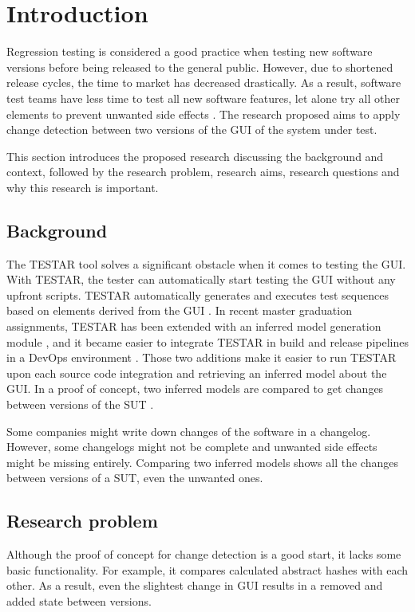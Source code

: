 \chapter{Introduction} \label{introduction}
    
Regression testing is considered a good practice when testing new software versions before being released to the general public. 
However, due to shortened release cycles, the time to market has decreased drastically. As a result, software test teams have less time to test all new software features, let alone try all other elements to prevent unwanted side effects \cite{rapid-release-cycle-issues}.
The research proposed aims to apply change detection between two versions of the GUI of the system under test. 

This section introduces the proposed research discussing the background and context, followed by the research problem, research aims, research questions and why this research is important.

\section{Background}
The TESTAR tool solves a significant obstacle when it comes to testing the GUI. With TESTAR, the tester can automatically start testing the GUI without any upfront scripts. TESTAR automatically generates and executes test sequences based on elements derived from the GUI \cite{VosAho2021}. In recent master graduation assignments, TESTAR has been extended with an inferred model generation module \cite{thesisMulders}, and it became easier to integrate TESTAR in build and release pipelines in a DevOps environment \cite{thesisSlomp}. Those two additions make it easier to run TESTAR upon each source code integration and retrieving an inferred model about the GUI. In a proof of concept, two inferred models are compared to get changes between versions of the SUT \cite{stateDiff}.

Some companies might write down changes of the software in a changelog. However, some changelogs might not be complete and unwanted side effects might be missing entirely. Comparing two inferred models shows all the changes between versions of a SUT, even the unwanted ones.

\section{Research problem}
Although the proof of concept for change detection is a good start, it lacks some basic functionality. For example, it compares calculated abstract hashes with each other. As a result, even the slightest change in GUI results in a removed and added state between versions.

